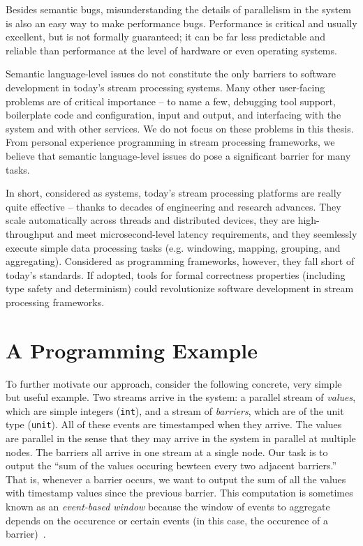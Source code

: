 Besides semantic bugs, misunderstanding the details of parallelism in the system is also an easy way to make performance bugs. Performance is critical and usually excellent, but is not formally guaranteed; it can be far less predictable and reliable than performance at the level of hardware or even operating systems.

Semantic language-level issues do not constitute the only barriers to software development in today's stream processing systems. Many other user-facing problems are of critical importance -- to name a few, debugging tool support, boilerplate code and configuration, input and output, and interfacing with the system and with other services. We do not focus on these problems in this thesis. From personal experience programming in stream processing frameworks, we believe that semantic language-level issues do pose a significant barrier for many tasks.

In short, considered as systems, today's stream processing platforms are really quite effective -- thanks to decades of engineering and research advances. They scale automatically across threads and distributed devices, they are high-throughput and meet microsecond-level latency requirements, and they seemlessly execute simple data processing tasks (e.g. windowing, mapping, grouping, and aggregating). Considered as programming frameworks, however, they fall short of today's standards. If adopted, tools for formal correctness properties (including type safety and determinism) could revolutionize software development in stream processing frameworks.

\section{A Programming Example}

To further motivate our approach, consider the following concrete, very simple but useful example.
Two streams arrive in the system: a parallel stream of \emph{values}, which are simple integers (\texttt{int}), and a stream of \emph{barriers}, which are of the unit type (\texttt{unit}).
All of these events are timestamped when they arrive.
The values are parallel in the sense that they may arrive in the system in parallel at multiple nodes.
The barriers all arrive in one stream at a single node.
Our task is to output the ``sum of the values occuring bewteen every two adjacent barriers.'' That is, whenever a barrier occurs, we want to output the sum of all the values with timestamp values since the previous barrier. This computation is sometimes known as an \emph{event-based window} because the window of events to aggregate depends on the occurence or certain events (in this case, the occurence of a barrier)~\cite{EventBasedWindow}.

